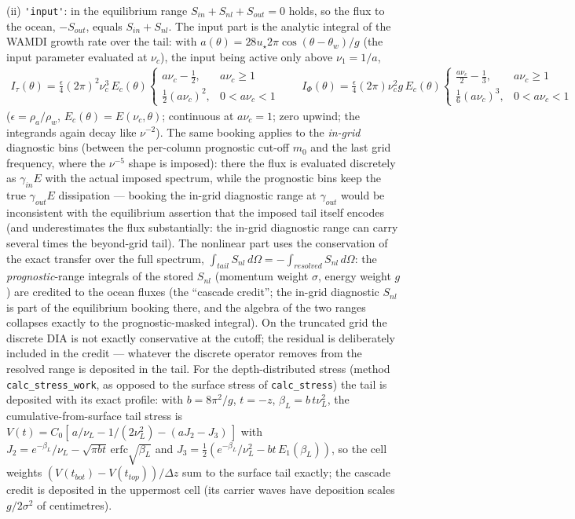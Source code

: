 \documentclass[12pt]{article}
\newcommand{\beq}  { \begin{eqnarray} }
\newcommand{\eeq}  { \end{eqnarray}}
\begin{document}
(ii) \verb|'input'|: in the equilibrium range $S_{in} + S_{nl} + S_{out} = 0$
holds, so the flux to the ocean, $-S_{out}$, equals $S_{in} + S_{nl}$. The
input part is the analytic integral of the WAMDI growth rate over the tail:
with $a(\theta) = 28 u_\star 2\pi \cos(\theta-\theta_w)/g$ (the input
parameter evaluated at $\nu_c$), the input being active only above
$\nu_1 = 1/a$,
\beq
I_\tau(\theta) = \frac{\epsilon}{4} (2\pi)^2 \nu_c^3\, E_c(\theta)
\left\{ \begin{array}{ll} a \nu_c - \frac{1}{2}, & a \nu_c \ge 1\\[2pt]
\frac{1}{2} (a \nu_c)^2, & 0 < a \nu_c < 1 \end{array} \right.
\qquad
I_\Phi(\theta) = \frac{\epsilon}{4} (2\pi) \nu_c^2 g\, E_c(\theta)
\left\{ \begin{array}{ll} \frac{a \nu_c}{2} - \frac{1}{3}, & a \nu_c \ge 1\\[2pt]
\frac{1}{6} (a \nu_c)^3, & 0 < a \nu_c < 1 \end{array} \right.
\eeq
($\epsilon = \rho_a/\rho_w$, $E_c(\theta) = E(\nu_c,\theta)$; continuous at
$a \nu_c = 1$; zero upwind; the integrands again decay like $\nu^{-2}$). The same booking applies to the
\emph{in-grid} diagnostic bins (between the per-column prognostic cut-off
$m_0$ and the last grid frequency, where the $\nu^{-5}$ shape is imposed):
there the flux is evaluated discretely as $\gamma_{in} E$ with the actual
imposed spectrum, while the prognostic bins keep the true $\gamma_{out} E$
dissipation --- booking the in-grid diagnostic range at $\gamma_{out}$ would be
inconsistent with the equilibrium assertion that the imposed tail itself
encodes (and underestimates the flux substantially: the in-grid diagnostic
range can carry several times the beyond-grid tail). The nonlinear part uses the
conservation of the exact transfer over the full spectrum,
$\int_{tail} S_{nl}\, d\Omega = -\int_{resolved} S_{nl}\, d\Omega$: the
\emph{prognostic}-range integrals of the stored $S_{nl}$ (momentum weight
$\sigma$, energy weight $g$) are credited to the ocean fluxes (the ``cascade
credit''; the in-grid diagnostic $S_{nl}$ is part of the equilibrium booking
there, and the algebra of the two ranges collapses exactly to the
prognostic-masked integral).
On the truncated grid the discrete DIA is not exactly conservative at the
cutoff; the residual is deliberately included in the credit --- whatever the
discrete operator removes from the resolved range is deposited in the tail.
For the depth-distributed stress (method \verb|calc_stress_work|, as opposed
to the surface stress of \verb|calc_stress|) the tail is
deposited with its exact profile: with $b = 8\pi^2/g$, $t=-z$,
$\beta_L = b\,t \nu_L^2$, the cumulative-from-surface tail stress is
$V(t) = C_0 [\, a/\nu_L - 1/(2\nu_L^2) - (a J_2 - J_3)\,]$ with
$J_2 = e^{-\beta_L}/\nu_L - \sqrt{\pi b t}\,\mathrm{erfc}\sqrt{\beta_L}$ and
$J_3 = \frac{1}{2}( e^{-\beta_L}/\nu_L^2 - b t\, E_1(\beta_L))$, so the cell
weights $(V(t_{bot})-V(t_{top}))/\Delta z$ sum to the surface tail exactly;
the cascade credit is deposited in the uppermost cell (its carrier waves
have deposition scales $g/2\sigma^2$ of centimetres).
\end{document}
